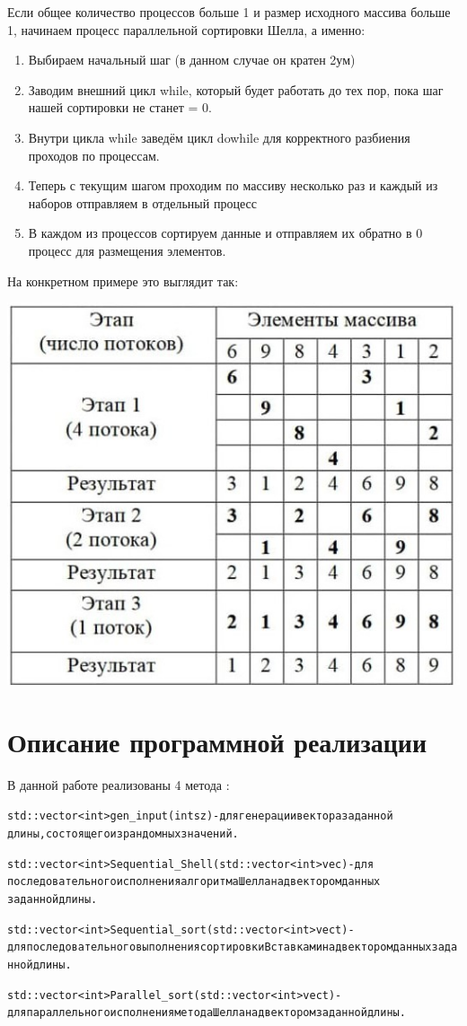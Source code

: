 \documentclass[12pt, letterpaper]{report}
\begin{document}
Если общее количество процессов больше 1 и размер исходного массива больше 1,
начинаем процесс параллельной сортировки Шелла, а именно:
\begin{enumerate} 
\item Выбираем начальный шаг (в данном случае он кратен 2ум)
\item Заводим внешний цикл while, который будет работать до тех пор, пока шаг
нашей сортировки не станет = 0.
\item Внутри цикла while заведём цикл do{}while для корректного разбиения
проходов по процессам.
\item Теперь с текущим шагом проходим по массиву несколько раз и каждый из
наборов отправляем в отдельный процесс
\item В каждом из процессов сортируем данные и отправляем их обратно в 0 процесс
для размещения элементов.

\end{enumerate}
На конкретном примере это выглядит так:
\par
\includegraphics[scale=0.7]{shell}
\chapter*{Описание программной реализации}
В данной работе реализованы 4 метода :
\begin{alltt}
std::vector<int> gen_input(int sz) {} - для генерации вектора заданной 
длины,состоящего из рандомных значений.

std::vector<int> Sequential_Shell(std::vector<int> vec) {} - для
последовательного исполнения алгоритма Шелла над вектором данных 
заданной длины.

std::vector<int> Sequential_sort(std::vector<int> vect) {} - для последовательного выполнения сортировки Вставками над вектором данных заданной длины.

std::vector<int> Parallel_sort(std::vector<int> vect) {} - для параллельного исполнения метода Шелла над вектором заданной длины.
\end{alltt}
\end{document}
